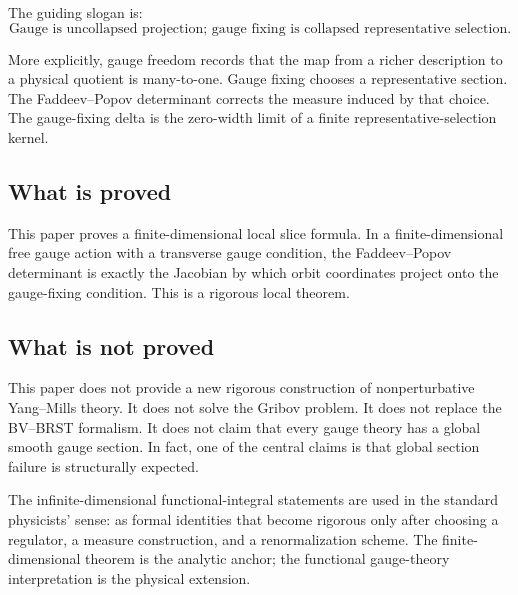 \documentclass[11pt]{article}
\begin{document}
The guiding slogan is:
\[
\boxed{\text{Gauge is uncollapsed projection; gauge fixing is collapsed representative selection.}}
\]

More explicitly, gauge freedom records that the map from a richer description to a physical quotient is many-to-one. Gauge fixing chooses a representative section. The Faddeev--Popov determinant corrects the measure induced by that choice. The gauge-fixing delta is the zero-width limit of a finite representative-selection kernel.

\subsection{What is proved}

This paper proves a finite-dimensional local slice formula. In a finite-dimensional free gauge action with a transverse gauge condition, the Faddeev--Popov determinant is exactly the Jacobian by which orbit coordinates project onto the gauge-fixing condition. This is a rigorous local theorem.

\subsection{What is not proved}

This paper does not provide a new rigorous construction of nonperturbative Yang--Mills theory. It does not solve the Gribov problem. It does not replace the BV--BRST formalism. It does not claim that every gauge theory has a global smooth gauge section. In fact, one of the central claims is that global section failure is structurally expected.

The infinite-dimensional functional-integral statements are used in the standard physicists' sense: as formal identities that become rigorous only after choosing a regulator, a measure construction, and a renormalization scheme. The finite-dimensional theorem is the analytic anchor; the functional gauge-theory interpretation is the physical extension.

\begin{center}
\end{center}
\end{document}
